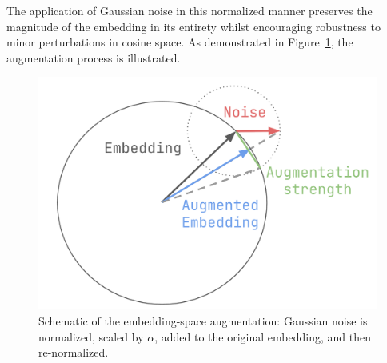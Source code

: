 
The application of Gaussian noise in this normalized manner preserves the magnitude of the embedding in its entirety whilst encouraging robustness to minor perturbations in cosine space. As demonstrated in Figure~\ref{fig:augmentation}, the augmentation process is illustrated.

\begin{figure}[h]
\centering
\includegraphics[width=0.6\linewidth]{asset/augmentation.png}
\caption{Schematic of the embedding-space augmentation: Gaussian noise is normalized, scaled by \(\alpha\), added to the original embedding, and then re-normalized.}
\label{fig:augmentation}
\end{figure}